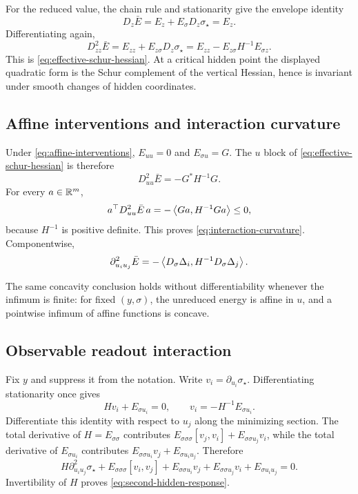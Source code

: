 For the reduced value, the chain rule and stationarity give the envelope identity
\[
D_z\bar E
=E_z+E_\sigma D_z\sigma_\star
=E_z.
\]
Differentiating again,
\[
D^2_{zz}\bar E
=E_{zz}+E_{z\sigma}D_z\sigma_\star
=E_{zz}-E_{z\sigma}H^{-1}E_{\sigma z}.
\]
This is \cref{eq:effective-schur-hessian}.  At a critical hidden point the displayed quadratic form is the Schur complement of the vertical Hessian, hence is invariant under smooth changes of hidden coordinates.

\subsection{Affine interventions and interaction curvature}

Under \cref{eq:affine-interventions}, $E_{uu}=0$ and $E_{\sigma u}=G$.  The $u$ block of \cref{eq:effective-schur-hessian} is therefore
\[
D^2_{uu}\bar E=-G^*H^{-1}G.
\]
For every $a\in\mathbb R^m$,
\[
a^\top D^2_{uu}\bar E\,a
=-\left\langle Ga,H^{-1}Ga\right\rangle\le0,
\]
because $H^{-1}$ is positive definite.  This proves \cref{eq:interaction-curvature}.  Componentwise,
\begin{equation}
\partial^2_{u_i u_j}\bar E
=-\left\langle D_\sigma\Delta_i,H^{-1}D_\sigma\Delta_j\right\rangle.
\label{eq:appendix-component-curvature}
\end{equation}

The same concavity conclusion holds without differentiability whenever the infimum is finite: for fixed $(y,\sigma)$, the unreduced energy is affine in $u$, and a pointwise infimum of affine functions is concave.

\subsection{Observable readout interaction}

Fix $y$ and suppress it from the notation.  Write
$v_i=\partial_{u_i}\sigma_\star$.  Differentiating stationarity once gives
\[
Hv_i+E_{\sigma u_i}=0,
\qquad
v_i=-H^{-1}E_{\sigma u_i}.
\]
Differentiate this identity with respect to $u_j$ along the minimizing
section.  The total derivative of $H=E_{\sigma\sigma}$ contributes
$E_{\sigma\sigma\sigma}[v_j,v_i]+E_{\sigma\sigma u_j}v_i$, while the total
derivative of $E_{\sigma u_i}$ contributes
$E_{\sigma\sigma u_i}v_j+E_{\sigma u_i u_j}$.  Therefore
\[
H\partial^2_{u_i u_j}\sigma_\star
+E_{\sigma\sigma\sigma}[v_i,v_j]
+E_{\sigma\sigma u_i}v_j
+E_{\sigma\sigma u_j}v_i
+E_{\sigma u_i u_j}=0.
\]
Invertibility of $H$ proves \cref{eq:second-hidden-response}.

